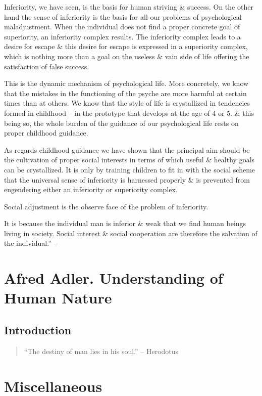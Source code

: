 \documentclass{article}
\begin{document}
Inferiority, we have seen, is the basis for human striving \& success. On the other hand the sense of inferiority is the basis for all our problems of psychological maladjustment. When the individual does not find a proper concrete goal of superiority, an inferiority complex results. The inferiority complex leads to a desire for escape \& this desire for escape is expressed in a superiority complex, which is nothing more than a goal on the useless \& vain side of life offering the satisfaction of false success.

This is the dynamic mechanism of psychological life. More concretely, we know that the mistakes in the functioning of the psyche are more harmful at certain times than at others. We know that the style of life is crystallized in tendencies formed in childhood -- in the prototype that develops at the age of 4 or 5. \& this being so, the whole burden of the guidance of our psychological life rests on proper childhood guidance.

As regards childhood guidance we have shown that the principal aim should be the cultivation of proper social interests in terms of which useful \& healthy goals can be crystallized. It is only by training children to fit in with the social scheme that the universal sense of inferiority is harnessed properly \& is prevented from engendering either an inferiority or superiority complex.

Social adjustment is the observe face of the problem of inferiority.

It is because the individual man is inferior \& weak that we find human beings living in society. Social interest \& social cooperation are therefore the salvation of the individual.'' -- \cite[pp. 263--264]{Adler_science_living}



\section{Afred Adler. Understanding of Human Nature}

\subsection{Introduction}

\begin{quote}
	``The destiny of man lies in his soul.'' -- {\sc Herodotus}
\end{quote}




\section{Miscellaneous}


\printbibliography[heading=bibintoc]
	
\end{document}
